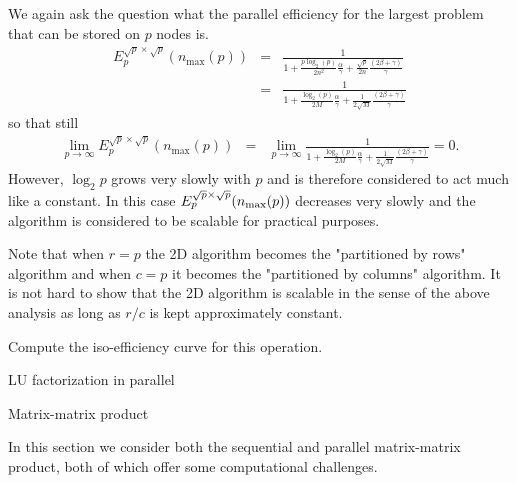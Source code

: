 We again ask the question what the parallel 
efficiency for the largest problem that can be stored on $ p $ nodes is.
\begin{eqnarray*}
E_p^{\sqrt{p} \times \sqrt{p}}(n_{\max}(p)) &=& 
\frac{1}
{ 1 + \frac{p \log_2(p)}{2 n^2} \frac{\alpha}{\gamma} 
+ \frac{\sqrt{p}}{2n}\frac{
\left( 2 \beta + \gamma \right)}{\gamma}}
\\
&=&
\frac{1}
{ 1 + \frac{\log_2(p)}{2 M} \frac{\alpha}{\gamma} 
+ \frac{1}{2\sqrt{M}}\frac{
\left( 2 \beta + \gamma \right)}{\gamma}}
\end{eqnarray*}
so that still
\begin{eqnarray*}
\lim_{p \rightarrow \infty}
E_p^{\sqrt{p} \times \sqrt{p}}(n_{\max}(p)) &=& 
\lim_{p \rightarrow \infty}
\frac{1}
{ 1 + \frac{\log_2(p)}{2 M} \frac{\alpha}{\gamma} 
+ \frac{1}{2\sqrt{M}}\frac{
\left( 2 \beta + \gamma \right)}{\gamma}}
=
0.
\end{eqnarray*}
However, $ \log_2{p} $ grows very slowly with $ p $ and is therefore
considered to act much like a constant.  In this case 
$ E_p^{\sqrt{p}\times \sqrt{p}}( n_{\rm max}(p) ) $ decreases very slowly and the algorithm is considered to be scalable for practical purposes.


Note that when $ r = p $ the 2D algorithm becomes the "partitioned by
rows" algorithm and when $ c = p $ it becomes the "partitioned by
columns" algorithm.  It is not hard to show that the 2D algorithm is
scalable in the sense of the above analysis
as long as $r/c$ is kept approximately constant.

\begin{exercise}
  Compute the iso-efficiency curve for this operation.
\end{exercise}


 {LU factorization in parallel}


 {Matrix-matrix product}

In this section we consider both the sequential and parallel
matrix-matrix product, both of which offer some computational challenges.

